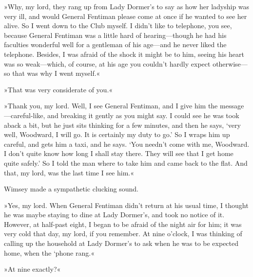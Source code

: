 »Why, my lord, they rang up from Lady Dormer's to say as how her ladyship was very ill, and would General Fentiman please come at once if he wanted to see her alive. So I went down to the Club myself. I didn't like to telephone, you see, because General Fentiman was a little hard of hearing—though he had his faculties wonderful well for a gentleman of his age—and he never liked the telephone. Besides, I was afraid of the shock it might be to him, seeing his heart was so weak—which, of course, at his age you couldn't hardly expect otherwise—so that was why I went myself.«

»That was very considerate of you.«

»Thank you, my lord. Well, I see General Fentiman, and I give him the message—careful-like, and breaking it gently as you might say. I could see he was took aback a bit, but he just sits thinking for a few minutes, and then he says, `very well, Woodward, I will go. It is certainly my duty to go.' So I wraps him up careful, and gets him a taxi, and he says. `You needn't come with me, Woodward. I don't quite know how long I shall stay there. They will see that I get home quite safely.' So I told the man where to take him and came back to the flat. And that, my lord, was the last time I see him.«

Wimsey made a sympathetic clucking sound.

»Yes, my lord. When General Fentiman didn't return at his usual time, I thought he was maybe staying to dine at Lady Dormer's, and took no notice of it. However, at half-past eight, I began to be afraid of the night air for him; it was very cold that day, my lord, if you remember. At nine o'clock, I was thinking of calling up the household at Lady Dormer's to ask when he was to be expected home, when the `phone rang.«

»At nine exactly?«

